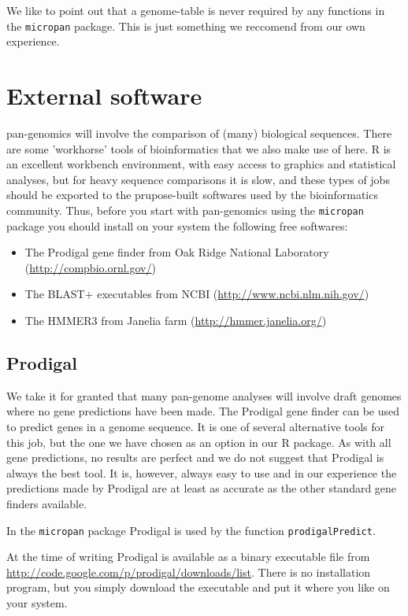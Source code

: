 \documentclass{article}
\begin{document}
We like to point out that a genome-table is never required by any functions in the \texttt{micropan} package. This is just something we reccomend from our own experience.



\section{External software}
pan-genomics will involve the comparison of (many) biological sequences. There are some 'workhorse' tools of bioinformatics that we also make use of here. R is an excellent workbench environment, with easy access to graphics and statistical analyses, but for heavy sequence comparisons it is slow, and these types of jobs should be exported to the prupose-built softwares used by the bioinformatics community. Thus, before you start with pan-genomics using the \texttt{micropan} package you should install on your system the following free softwares:
\begin{itemize}
\item The Prodigal gene finder from Oak Ridge National Laboratory \\ (\url{http://compbio.ornl.gov/})
\item The BLAST+ executables from NCBI (\url{http://www.ncbi.nlm.nih.gov/})
\item The HMMER3 from Janelia farm (\url{http://hmmer.janelia.org/})
\end{itemize}


\subsection{Prodigal}
We take it for granted that many pan-genome analyses will involve draft genomes where no gene predictions have been made. The Prodigal gene finder can be used to predict genes in a genome sequence. It is one of several alternative tools for this job, but the one we have chosen as an option in our R package. As with all gene predictions, no results are perfect and we do not suggest that Prodigal is always the best tool. It is, however, always easy to use and in our experience the predictions made by Prodigal are at least as accurate as the other standard gene finders available.

In the \texttt{micropan} package Prodigal is used by the function \texttt{prodigalPredict}.

At the time of writing Prodigal is available as a binary executable file from \url{http://code.google.com/p/prodigal/downloads/list}. There is no installation program, but you simply download the executable and put it where you like on your system.
\end{document}
